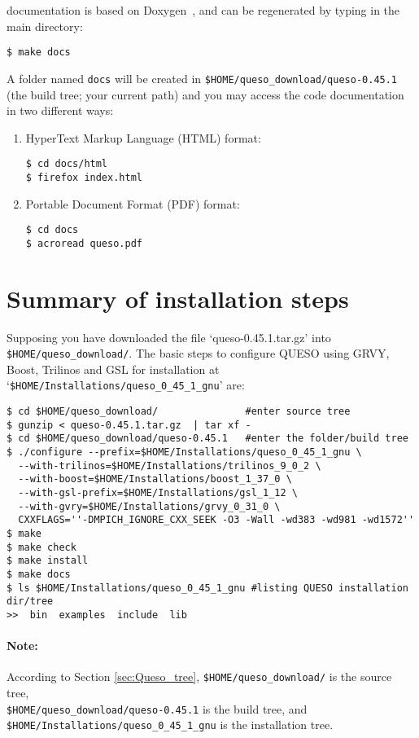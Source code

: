 \Queso{} documentation is  based on Doxygen~\cite{Doxygen}, and can be regenerated by typing in the main directory:
\begin{verbatim}
$ make docs
\end{verbatim}

A folder named \verb+docs+ will be created in \verb+$HOME/queso_download/queso-0.45.1+ (the build tree; your current path) and you may access the code documentation in two different ways:
\begin{enumerate}
\item HyperText Markup Language (HTML)  format:
\begin{verbatim}
$ cd docs/html
$ firefox index.html
\end{verbatim}

\item Portable Document Format (PDF) format:
\begin{verbatim}
$ cd docs
$ acroread queso.pdf
\end{verbatim}

\end{enumerate}

\section{Summary of installation steps}


Supposing you have downloaded the file `queso-0.45.1.tar.gz' into \texttt{\$HOME/queso\_download/}.
%
The basic steps to configure QUESO using GRVY, Boost, Trilinos and GSL for installation at `\verb+$HOME/Installations/queso_0_45_1_gnu+'  are:

\begin{verbatim}
$ cd $HOME/queso_download/               #enter source tree
$ gunzip < queso-0.45.1.tar.gz  | tar xf -
$ cd $HOME/queso_download/queso-0.45.1   #enter the folder/build tree 
$ ./configure --prefix=$HOME/Installations/queso_0_45_1_gnu \
  --with-trilinos=$HOME/Installations/trilinos_9_0_2 \
  --with-boost=$HOME/Installations/boost_1_37_0 \
  --with-gsl-prefix=$HOME/Installations/gsl_1_12 \
  --with-gvry=$HOME/Installations/grvy_0_31_0 \
  CXXFLAGS=''-DMPICH_IGNORE_CXX_SEEK -O3 -Wall -wd383 -wd981 -wd1572''
$ make 
$ make check
$ make install 
$ make docs
$ ls $HOME/Installations/queso_0_45_1_gnu #listing QUESO installation dir/tree
>>  bin  examples  include  lib
\end{verbatim}

\paragraph*{Note:} According to  Section \ref{sec:Queso_tree}, \texttt{\$HOME/queso\_download/} is the source tree, \\ \verb+$HOME/queso_download/queso-0.45.1+ is the build tree, and \newline
\verb+$HOME/Installations/queso_0_45_1_gnu+ is the installation tree.



